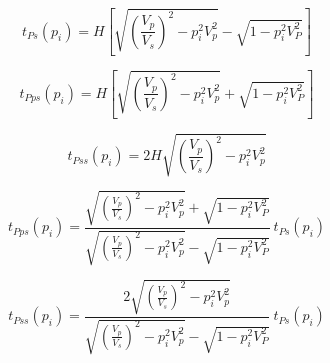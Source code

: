 \documentclass {letter}
\begin{document}
\begin{letter}


\begin{equation}
t_{Ps}(p_i)=H \left[ \sqrt{ \left(\frac{V_p}{V_s}\right)^2 - p_i^2V_p^2} - \sqrt{1 - p_i^2V_P^2} \right]
\end{equation}

\begin{equation}
t_{Pps}(p_i)=H \left[ \sqrt{ \left(\frac{V_p}{V_s}\right)^2 - p_i^2V_p^2} + \sqrt{1 - p_i^2V_P^2} \right]
\end{equation}

\begin{equation}
t_{Pss}(p_i)= 2H  \sqrt{ \left(\frac{V_p}{V_s}\right)^2 - p_i^2V_p^2}
\end{equation}

\begin{equation}
t_{Pps}(p_i) =
 \frac{ \sqrt{ \left(\frac{V_p}{V_s}\right)^2 - p_i^2V_p^2} + \sqrt{1 - p_i^2V_P^2} }
      { \sqrt{ \left(\frac{V_p}{V_s}\right)^2 - p_i^2V_p^2} - \sqrt{1 - p_i^2V_P^2} } \: t_{Ps}(p_i)
\end{equation}

\begin{equation}
t_{Pss}(p_i) =
 \frac{ 2 \sqrt{ \left(\frac{V_p}{V_s}\right)^2 - p_i^2V_p^2} }
      {\sqrt{ \left(\frac{V_p}{V_s}\right)^2 - p_i^2V_p^2} - \sqrt{1 - p_i^2V_P^2}} \: t_{Ps}(p_i)
\end{equation}




\end{letter}
\end{document}
